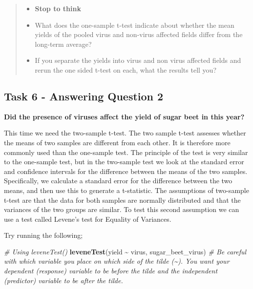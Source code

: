 \documentclass[
]{book}
\newenvironment{Shaded}{\begin{snugshade}}{\end{snugshade}}
\newcommand{\CommentTok}[1]{\textcolor[rgb]{0.56,0.35,0.01}{\textit{#1}}}
\newcommand{\FunctionTok}[1]{\textcolor[rgb]{0.13,0.29,0.53}{\textbf{#1}}}
\newcommand{\NormalTok}[1]{#1}
\newcommand{\SpecialCharTok}[1]{\textcolor[rgb]{0.81,0.36,0.00}{\textbf{#1}}}
\providecommand{\tightlist}{%
  \setlength{\itemsep}{0pt}\setlength{\parskip}{0pt}}
\begin{document}
\begin{quote}
\begin{itemize}
\tightlist
\item
  \textbf{Stop to think}
\item
  What does the one-sample t-test indicate about whether the mean yields of the pooled virus and non-virus affected fields differ from the long-term average?
\item
  If you separate the yields into virus and non virus affected fields and rerun the one sided t-test on each, what the results tell you?
\end{itemize}
\end{quote}

\subsection{Task 6 - Answering Question 2}\label{levene-test}

\textbf{Did the presence of viruses affect the yield of sugar beet in this year?}

This time we need the two-sample t-test. The two sample t-test assesses whether the means of two samples are different from each other. It is therefore more commonly used than the one-sample test. The principle of the test is very similar to the one-sample test, but in the two-sample test we look at the standard error and confidence intervals for the difference between the means of the two samples. Specifically, we calculate a standard error for the difference between the two means, and then use this to generate a t-statistic. The assumptions of two-sample t-test are that the data for both samples are normally distributed and that the variances of the two groups are similar. To test this second assumption we can use a test called Levene's test for Equality of Variances.

Try running the following;

\begin{Shaded}
\begin{Highlighting}[]
\CommentTok{\# Using leveneTest()}
\FunctionTok{leveneTest}\NormalTok{(yield }\SpecialCharTok{\textasciitilde{}}\NormalTok{ virus, sugar\_beet\_virus)}
\CommentTok{\# Be careful with which variable you place on which side of the tilde (\textasciitilde{}). You want your dependent (response) variable to be before the tilde and the independent (predictor) variable to be after the tilde.}
\end{Highlighting}
\end{Shaded}
\end{document}
